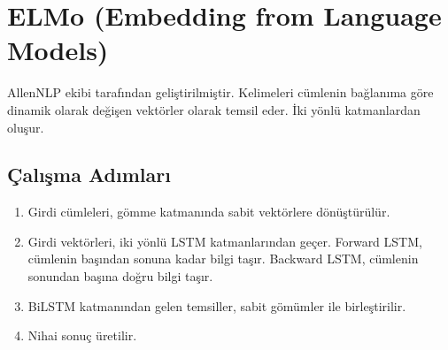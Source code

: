 \section{ELMo (Embedding from Language Models)}
AllenNLP ekibi tarafından geliştirilmiştir. Kelimeleri cümlenin bağlanıma göre dinamik olarak değişen vektörler olarak temsil eder. İki yönlü katmanlardan oluşur. 

\subsection{Çalışma Adımları}
\begin{enumerate}
	\item Girdi cümleleri, gömme katmanında sabit vektörlere dönüştürülür.
	\item Girdi vektörleri, iki yönlü LSTM katmanlarından geçer. Forward LSTM, cümlenin başından sonuna kadar bilgi taşır. Backward LSTM, cümlenin sonundan başına doğru bilgi taşır.
	\item BiLSTM katmanından gelen temsiller, sabit gömümler ile birleştirilir.
	\item Nihai sonuç üretilir.
\end{enumerate}

\newpage